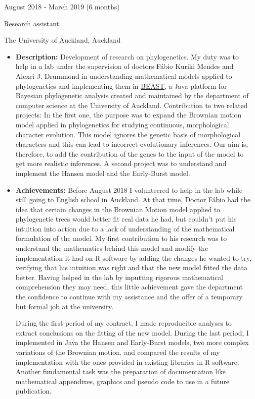 \documentclass[a4paper,10pt]{article}
\newlength{\cvcolumngapwidth}
\newlength{\cvleftcolumnwidth}
\newlength{\cvrightcolumnwidth}
\newcommand{\cvtitlestyle}[1]{{\large\cvtitlefont\textcolor{cvtitlecolor}{#1}}}
\newcommand{\cvdurationstyle}[1]{{\small\cvdurationfont\textcolor{cvdurationcolor}{#1}}}
\newlength{\cvafteritemskipamount}
\newlength{\cvaftertitleskipamount}
\newlength{\cvparskip}
\newcommand{\cvitem}[2]{
    \begin{minipage}[t]{\cvleftcolumnwidth}
        \raggedleft #1
    \end{minipage}%
    \hspace{\cvcolumngapwidth}%
    \begin{minipage}[t]{\cvrightcolumnwidth}
        \setlength{\parskip}{\cvparskip} #2
    \end{minipage}

    \vspace{\cvafteritemskipamount}
}
\newcommand{\cvtitle}[1]{
    \cvtitlestyle{#1}

    \vspace{\cvaftertitleskipamount}
    \vspace{-\cvparskip}
}
\begin{document}

\cvitem{
    \cvdurationstyle{August 2018 - March 2019
   \hspace{15pt} (6 months)}
}{
    \cvtitle{Research assistant}
    
    The University of Auckland, Auckland  
    \vspace{5pt}
    \begin{itemize}[leftmargin=*]
        \item \textbf{Description:} Development of research on phylogenetics. My duty was to help in a lab under the supervision of doctors Fábio Kuriki Mendes and Alexei J. Drummond in understanding mathematical models applied to phylogenetics and implementing them in \href{https://www.beast2.org}{BEAST}, a Java platform for Bayesian phylogenetic analysis created and maintained by the department of computer science at the University of Auckland. Contribution to two related projects: In the first one, the purpose was to expand the Brownian motion model applied in phylogenetics for studying continuous, morphological character evolution. This model ignores the genetic basis of morphological characters and this can lead to incorrect evolutionary inferences. Our aim is, therefore, to add the contribution of the genes to the input of the model to get more realistic inferences. A second project was to understand and implement the Hansen model and the Early-Burst model.
        \vspace{5pt}
        \item \textbf{Achievements:} Before August 2018 I volunteered to help in the lab while still going to English school in Auckland. At that time, Doctor Fábio had the idea that certain changes in the Brownian Motion model applied to phylogenetic trees would better fit real data he had, but couldn't put his intuition into action due to a lack of understanding of the mathematical formulation of the model. My first contribution to his research was to understand the mathematics behind this model and modify the implementation it had on R software by adding the changes he wanted to try, verifying that his intuition was right and that the new model fitted the data better. Having helped in the lab by inputting rigorous mathematical comprehension they may need, this little achievement gave the department the confidence to continue with my assistance and the offer of a temporary but formal job at the university.\newline
        
        During the first period of my contract, I made reproducible analyses to extract conclusions on the fitting of the new model.
        During the last period, I implemented in Java the Hansen and Early-Burst models, two more complex variations of the Brownian motion, and compared the results of my implementation with the ones provided in existing libraries in R software. Another fundamental task was the preparation of documentation like mathematical appendixes, graphics and pseudo code to use in a future publication.
    \end{itemize}
}
\end{document}
